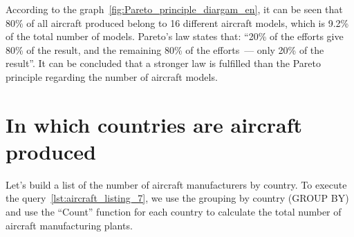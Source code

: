 \begin{figure*}[h]

    \setlength{\fboxsep}{0pt}%
    \setlength{\fboxrule}{1pt}%

	\caption{Percentage of the number of aircraft models produced by all airlines to the total number of aircraft manufactured for all time, 2020.}%
    \label{fig:Pareto_principle_diargam_en}%
\end{figure*}

According to the graph~\ref{fig:Pareto_principle_diargam_en}, it can be seen that 80\% of all aircraft produced belong to 16 different aircraft 
models, which is 9.2\% of the total number of models. Pareto's law states that: ``20\% of the efforts give 80\% of the result, and the remaining 80\%
 of the efforts~--- only 20\% of the result''. It can be concluded that a stronger law is fulfilled than the Pareto principle regarding the number 
 of aircraft models.

\label{question:aircraft_question_3}


\section{In which countries are aircraft produced}

Let's build a list of the number of aircraft manufacturers by country. To execute the query~\ref{lst:aircraft_listing_7}, we use the grouping 
by country (GROUP BY) and use the ``Count'' function for each country to calculate the total number of aircraft manufacturing plants.

